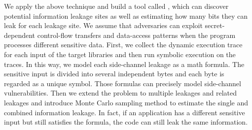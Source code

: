 We apply the above technique and build a tool called \tool{},
which can discover potential information leakage sites as well as estimating how
many bits they can leak for each leakage site. We assume that adversaries can
exploit secret-dependent control-flow transfers and data-access patterns when
the program processes different sensitive data.
First, we collect the dynamic execution trace for each input of the target
libraries and then run symbolic execution on the traces. In this way, we model
each side-channel leakage as a math formula. The sensitive input is divided into
several independent bytes and each byte is regarded as a unique symbol. Those
formulas can precisely model side-channel vulnerabilities. Then we extend the
problem to multiple leakages and related leakages and introduce Monte Carlo
sampling method to estimate the single and combined information leakage. In
fact, if an application has a different sensitive input but still satisfies the
formula, the code can still leak the same information.





